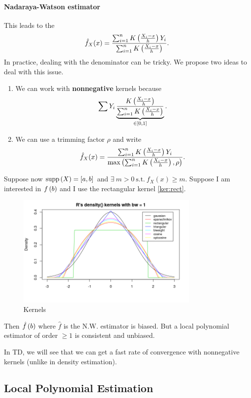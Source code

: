 \paragraph{Nadaraya-Watson estimator} This leads to the $$\hat{f}_X(x) = \frac{\sum_{i=1}^n K\left(\frac{X_i-x}{h}\right)Y_i}{\sum_{i=1}^n K\left(\frac{X_i-x}{h}\right)}.$$
In practice, dealing with the denominator can be tricky. We propose two ideas to deal with this issue.
\begin{enumerate}
    \item We can work with \textbf{nonnegative} kernels because \begin{equation*}
        \sum Y_i \underbrace{\frac{K\left(\frac{X_i-x}{h}\right)}{\sum_{i=1}^n K\left(\frac{X_i-x}{h}\right)}}_{\in \left[0,1\right]}.
    \end{equation*}
    \item We can use a trimming factor $\rho$ and write $$\hat{f}_X(x) = \frac{\sum_{i=1}^n K\left(\frac{X_i-x}{h}\right)Y_i}{\max\left(\sum_{i=1}^n K\left(\frac{X_i-x}{h}\right),\rho\right)}.$$
\end{enumerate}
Suppose now $\text{supp}\left(X\right)=[a,b]$ and $\exists\ m>0\ \text{s.t.}\ f_X(x)\ge m$. Suppose I am interested in $f\left(b\right)$ and I use the rectangular kernel \ref{ker:rect}. 
\begin{figure}[!h]
    \centering
    \includegraphics[width=0.8\textwidth]{figures/kernels.png}
    \caption{Kernels}
\end{figure}
Then $\hat{f}\left(b\right)$ where $\hat{f}$ is the N.W. estimator is biased. But a local polynomial estimator of order $\ge 1$ is consistent and unbiased.
\begin{remark}
    In TD, we will see that we can get a fast rate of convergence with nonnegative kernels (unlike in density estimation).
\end{remark}
\subsection{Local Polynomial Estimation}
